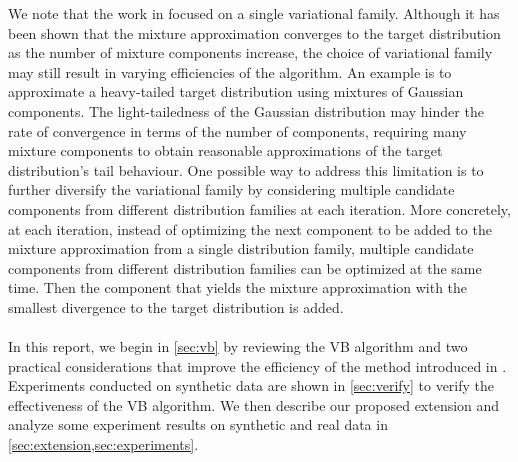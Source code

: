 We note that the work in \cite{miller2017variational} focused on a single variational family. Although it has been shown that the mixture approximation converges to the target distribution as the number of mixture components increase, the choice of variational family may still result in varying efficiencies of the algorithm. An example is to approximate a heavy-tailed target distribution using mixtures of Gaussian components. The light-tailedness of the Gaussian distribution may hinder the rate of convergence in terms of the number of components, requiring many mixture components to obtain reasonable approximations of the target distribution's tail behaviour. One possible way to address this limitation is to further diversify the variational family by considering multiple candidate components from different distribution families at each iteration. More concretely, at each iteration, instead of optimizing the next component to be added to the mixture approximation from a single distribution family, multiple candidate components from different distribution families can be optimized at the same time. Then the component that yields the mixture approximation with the smallest divergence to the target distribution is added.\\\\
In this report, we begin in \cref{sec:vb} by reviewing the VB algorithm and two practical considerations that improve the efficiency of the method introduced in \cite{miller2017variational}. Experiments conducted on synthetic data are shown in \cref{sec:verify} to verify the effectiveness of the VB algorithm. We then describe our proposed extension and analyze some experiment results on synthetic and real data in \cref{sec:extension,sec:experiments}.

